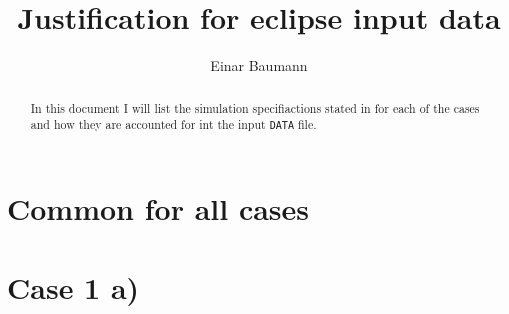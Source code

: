 

\author{Einar Baumann}
\title{Justification for eclipse input data}


\maketitle

\begin{abstract}
  In this document I will list the simulation specifiactions stated in \cite{spe7-1991} for each of the cases and how they are accounted for int the input \texttt{DATA} file.
\end{abstract}


\section{Common for all cases} %
\label{sec:common_for_all_cases}



\section{Case 1 a)} %
\label{sec:case_1_a}


{}


